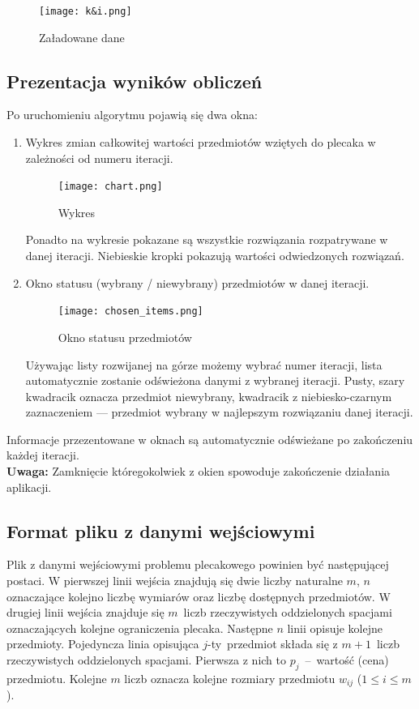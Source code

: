 \documentclass[a4paper,12pt,notitlepage]{mwrep}
\begin{document}
\begin{figure}[H]
\centering
\texttt{[image: k\&i.png]}
\caption{Załadowane dane}
\label{fig:ki}
\end{figure}

\subsection{Prezentacja wyników obliczeń}
Po uruchomieniu algorytmu pojawią się dwa okna:
\begin{enumerate}
	\item	Wykres zmian całkowitej wartości przedmiotów wziętych do plecaka
			w zależności od numeru iteracji.\\
			\begin{figure}[H]
			\centering
			\texttt{[image: chart.png]}
			\caption{Wykres}
			\label{fig:chart}
			\end{figure}
			Ponadto na wykresie pokazane są wszystkie rozwiązania rozpatrywane w danej iteracji.
			Niebieskie kropki pokazują wartości odwiedzonych rozwiązań.
	\item	Okno statusu (wybrany / niewybrany) przedmiotów w danej iteracji.\\
			\begin{figure}[H]
			\centering
			\texttt{[image: chosen\_items.png]}
			\caption{Okno statusu przedmiotów}
			\label{fig:chosen_items}
			\end{figure}
			Używając listy rozwijanej na górze możemy wybrać numer iteracji,
			lista automatycznie zostanie odświeżona danymi z wybranej iteracji.
			Pusty, szary kwadracik oznacza przedmiot niewybrany, kwadracik z niebiesko-czarnym
			zaznaczeniem --- przedmiot wybrany w najlepszym rozwiązaniu danej iteracji.
\end{enumerate}
Informacje przezentowane w oknach są automatycznie odświeżane po zakończeniu każdej iteracji.\\
\textbf{Uwaga:} Zamknięcie któregokolwiek z okien spowoduje zakończenie działania aplikacji.


\subsection{Format pliku z danymi wejściowymi} \label{format}
Plik z danymi wejściowymi problemu plecakowego powinien być następującej postaci. W pierwszej
linii wejścia znajdują się dwie liczby naturalne $m$, $n$ oznaczające kolejno liczbę wymiarów
oraz liczbę dostępnych przedmiotów. W drugiej linii wejścia znajduje się $m$~liczb rzeczywistych oddzielonych
spacjami oznaczających kolejne ograniczenia plecaka. Następne $n$ linii opisuje kolejne przedmioty.
Pojedyncza linia opisująca $j$-ty~przedmiot składa się z $m+1$~liczb rzeczywistych oddzielonych spacjami.
Pierwsza z nich to $p_j$~--~wartość (cena)
przedmiotu. Kolejne $m$ liczb oznacza kolejne rozmiary przedmiotu $w_{ij}$  ($1 \le i \le m$).
\end{document}
